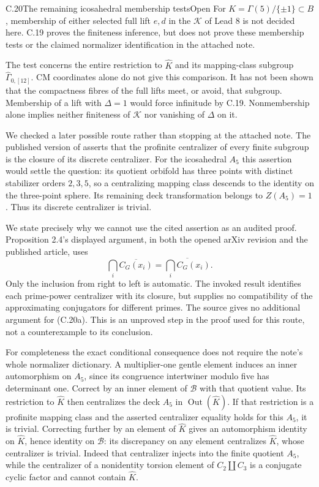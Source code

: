 \begin{statement}{C.20}{The remaining icosahedral membership tests}{Open}
For \(K=\Gamma(5)/\{\pm1\}\subset B\),
membership of either selected full
lift \(e,d\) in the \(\mathcal K\)
of Lead 8 is not decided here.
C.19 proves the finiteness inference,
but does not prove these membership
tests or the claimed normalizer
identification in the attached note.
\end{statement}

The test concerns the entire
restriction to \(\widehat K\)
and its mapping-class subgroup
\(\widehat\Gamma_{0,[12]}\).
CM coordinates alone do not give
this comparison. It has not been
shown that the compactness fibres
of the full lifts meet, or avoid,
that subgroup. Membership of a
lift with \(\Delta=1\) would
force infinitude by C.19.
Nonmembership alone implies
neither finiteness of \(\mathcal K\)
nor vanishing of \(\Delta\) on it.

We checked a later possible route rather than stopping
at the attached note. The published version of
\citet[Theorem C(iii), Proposition 2.4]{cBoggi2026}
asserts that the profinite centralizer of every finite
subgroup is the closure of its discrete centralizer.
For the icosahedral \(A_5\) this assertion would settle
the question: its quotient orbifold has three points
with distinct stabilizer orders \(2,3,5\), so a
centralizing mapping class descends to the identity
on the three-point sphere. Its remaining deck
transformation belongs to \(Z(A_5)=1\). Thus its
discrete centralizer is trivial.

We state precisely why we cannot use the cited
assertion as an audited proof. Proposition 2.4's
displayed argument, in both the opened arXiv revision
and the published article, uses
\[
 \bigcap_i\overline{C_G(x_i)}
      =\overline{\bigcap_i C_G(x_i)}.
 \tag{C.20a}
\]
Only the inclusion from right to left is automatic.
The invoked result
\citep[Theorem A(iii)]{cBoggiZalesskii2025}
identifies each prime-power centralizer with its
closure, but supplies no compatibility of the
approximating conjugators for different primes.
The source gives no additional argument for (C.20a).
This is an unproved step in the proof used for this
route, not a counterexample to its conclusion.

For completeness the exact conditional consequence
does not require the note's whole normalizer
dictionary. A multiplier-one gentle element induces
an inner automorphism on \(A_5\), since its congruence
intertwiner modulo five has determinant one. Correct
by an inner element of \(\mathcal B\) with that
quotient value. Its restriction to \(\widehat K\)
then centralizes the deck \(A_5\) in
\(\operatorname{Out}(\widehat K)\). If that restriction
is a profinite mapping class and the asserted
centralizer equality holds for this \(A_5\), it is
trivial. Correcting further by an element of
\(\widehat K\) gives an automorphism identity on
\(\widehat K\), hence identity on \(\mathcal B\):
its discrepancy on any element centralizes
\(\widehat K\), whose centralizer is trivial.
Indeed that centralizer injects into the finite
quotient \(A_5\), while the centralizer of a
nonidentity torsion element of \(C_2\amalg C_3\)
is a conjugate cyclic factor and cannot contain
\(\widehat K\).

